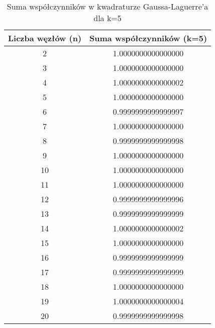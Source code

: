 \documentclass{article}
\begin{document}
\begin{table}[h!]
\centering
\begin{tabular}{cc}
\toprule
Liczba węzłów (n) & Suma współczynników (k=5) \\
\midrule
2  & 1.0000000000000000 \\
3  & 1.0000000000000000 \\
4  & 1.0000000000000002 \\
5  & 1.0000000000000000 \\
6  & 0.9999999999999997 \\
7  & 1.0000000000000000 \\
8  & 0.9999999999999998 \\
9  & 1.0000000000000000 \\
10 & 1.0000000000000000 \\
11 & 1.0000000000000000 \\
12 & 0.9999999999999996 \\
13 & 0.9999999999999999 \\
14 & 1.0000000000000002 \\
15 & 1.0000000000000000 \\
16 & 0.9999999999999999 \\
17 & 0.9999999999999999 \\
18 & 1.0000000000000000 \\
19 & 1.0000000000000004 \\
20 & 0.9999999999999998 \\
\bottomrule
\end{tabular}
\caption{Suma współczynników w kwadraturze Gaussa-Laguerre'a dla k=5}
\label{tab:coeff_k5}
\end{table}
\end{document}
